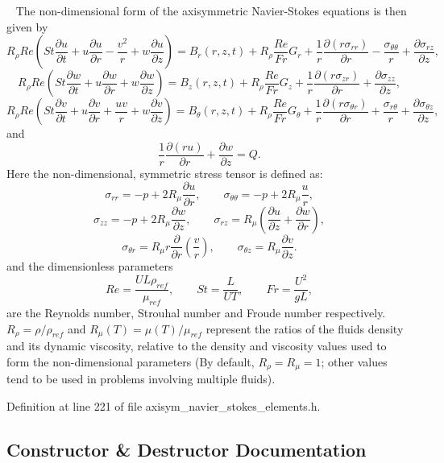 ~\newline
The non-\/dimensional form of the axisymmetric Navier-\/\+Stokes equations is then given by \[ R_{\rho} Re\left(St\frac{\partial u}{\partial t} + {u}\frac{\partial u}{\partial r} - \frac{{v}^2}{r} + {w}\frac{\partial u}{\partial z} \right) = B_r\left(r,z,t\right)+ R_\rho \frac{Re}{Fr} G_r + \frac{1}{r} \frac{\partial\left({r}\sigma_{rr}\right)}{\partial r} - \frac{\sigma_{\theta\theta}}{r} + \frac{\partial\sigma_{rz}}{\partial z}, \] \[ R_{\rho} Re\left(St\frac{\partial w}{\partial t} + {u}\frac{\partial w}{\partial r} + {w}\frac{\partial w}{\partial z} \right) = B_z\left(r,z,t\right)+ R_\rho \frac{Re}{Fr} G_z+ \frac{1}{r}\frac{\partial\left({r}\sigma_{zr}\right)}{\partial r} + \frac{\partial\sigma_{zz}}{\partial z}, \] \[ R_{\rho} Re\left(St\frac{\partial v}{\partial t} + {u}\frac{\partial v}{\partial r} + \frac{u v}{r} +{w}\frac{\partial v}{\partial z} \right)= B_\theta\left(r,z,t\right)+ R_\rho \frac{Re}{Fr} G_\theta+ \frac{1}{r}\frac{\partial\left({r}\sigma_{\theta r}\right)}{\partial r} + \frac{\sigma_{r\theta}}{r} + \frac{\partial\sigma_{\theta z}}{\partial z}, \] and \[ \frac{1}{r}\frac{\partial\left(ru\right)}{\partial r} + \frac{\partial w}{\partial z} = Q. \] Here the non-\/dimensional, symmetric stress tensor is defined as\+: \[ \sigma_{rr} = -p + 2R_\mu \frac{\partial u}{\partial r}, \qquad \sigma_{\theta\theta} = -p +2R_\mu \frac{u}{r}, \] \[ \sigma_{zz} = -p + 2R_\mu \frac{\partial w}{\partial z}, \qquad \sigma_{rz} = R_\mu \left(\frac{\partial u}{\partial z} + \frac{\partial w}{\partial r}\right), \] \[ \sigma_{\theta r} = R_\mu r \frac{\partial}{\partial r}\left(\frac{v}{r}\right), \qquad \sigma_{\theta z} = R_\mu \frac{\partial v}{\partial z}. \] and the dimensionless parameters \[ Re = \frac{UL\rho_{ref}}{\mu_{ref}}, \qquad St = \frac{L}{UT}, \qquad Fr = \frac{U^2}{gL}, \] are the Reynolds number, Strouhal number and Froude number respectively. $ R_\rho=\rho/\rho_{ref} $ and $ R_\mu(T) =\mu(T)/\mu_{ref}$ represent the ratios of the fluid\textquotesingle{}s density and its dynamic viscosity, relative to the density and viscosity values used to form the non-\/dimensional parameters (By default, $ R_\rho = R_\mu = 1 $; other values tend to be used in problems involving multiple fluids). 

Definition at line 221 of file axisym\+\_\+navier\+\_\+stokes\+\_\+elements.\+h.



\subsection{Constructor \& Destructor Documentation}
\mbox{\label{classoomph_1_1AxisymmetricNavierStokesEquations_a639d6998fea9b62d0341b8ae6547aecf}} 
